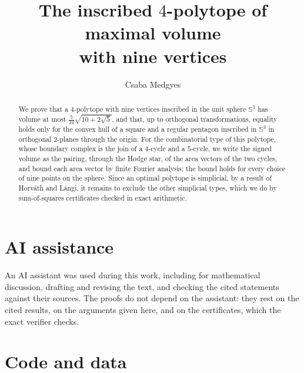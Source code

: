 \documentclass[11pt,reqno]{amsart}
\title[The inscribed $4$-polytope of maximal volume with nine vertices]
      {The inscribed $4$-polytope of maximal volume\\ with nine vertices}
\author{Csaba Medgyes}
\newcounter{artifact}
\theoremstyle{definition}
\begin{document}
\begin{abstract}
  We prove that a $4$-polytope with nine vertices inscribed in the unit sphere
  $\mathbb{S}^{3}$ has volume at most $\frac{5}{24}\sqrt{10 + 2\sqrt{5}}$, and
  that, up to orthogonal transformations, equality holds only for the convex
  hull of a square and a regular pentagon inscribed in $\mathbb{S}^{3}$ in
  orthogonal $2$-planes through the origin. For the combinatorial type of this
  polytope, whose boundary complex is the join of a $4$-cycle and a $5$-cycle,
  we write the signed volume as the pairing,
  through the Hodge star, of the area vectors of the two cycles, and bound each
  area vector by finite Fourier analysis; the bound holds for every choice of
  nine points on the sphere. Since an optimal polytope is
  simplicial, by a result of Horv\'ath and L\'angi, it remains to exclude the
  other simplicial types, which we do by sum-of-squares certificates checked in
  exact arithmetic.
\end{abstract}

\maketitle









\section*{AI assistance}

An AI assistant was used during this work, including for mathematical
discussion, drafting and revising the text, and checking the cited statements
against their sources. The proofs do not depend on the assistant: they rest on
the cited results, on the arguments given here, and on the certificates, which
the exact verifier checks.

\section*{Code and data}
\label{sec:artifacts}
\end{document}
